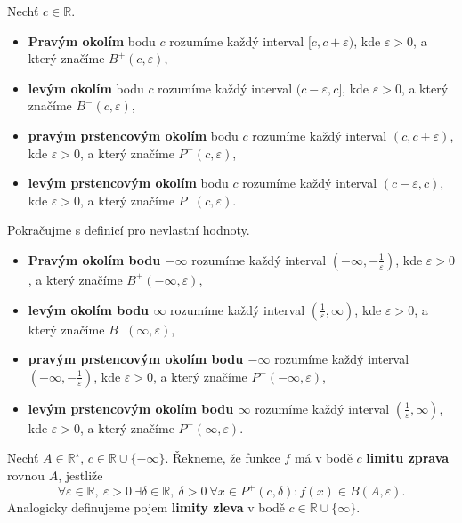 \begin{definice}
	Nechť $c\in \mathbb R $.
	\begin{itemize}
  \item \textbf{Pravým okolím} bodu $c$ rozumíme každý interval
  $[c, c + \varepsilon)$, kde $\varepsilon > 0$, a který značíme $B^+(c,\varepsilon)$,
  \item \textbf{levým okolím} bodu $c$ rozumíme každý interval
  $(c - \varepsilon, c]$, kde $\varepsilon > 0$, a který značíme $B^-(c,\varepsilon)$,
  \item \textbf{pravým prstencovým okolím} bodu $c$ rozumíme každý interval
  $(c, c + \varepsilon)$, kde $\varepsilon > 0$, a který značíme $P^+(c,\varepsilon)$,
  \item \textbf{levým prstencovým okolím} bodu $c$ rozumíme každý interval
  $(c - \varepsilon, c)$, kde $\varepsilon > 0$, a který značíme $P^-(c,\varepsilon)$.
\end{itemize}
Pokračujme s definicí pro nevlastní hodnoty.
\begin{itemize}
  \item \textbf{Pravým okolím bodu $-\infty$} rozumíme každý interval
  $\left(-\infty, -\frac{1}{\varepsilon}\right)$, kde $\varepsilon > 0$,
  a který značíme $B^+(-\infty,\varepsilon)$,
  \item \textbf{levým okolím bodu $\infty$} rozumíme každý interval
  $\left(\frac{1}{\varepsilon}, \infty\right)$, kde $\varepsilon > 0$,
  a který značíme $B^-(\infty,\varepsilon)$,
  \item \textbf{pravým prstencovým okolím bodu $-\infty$} rozumíme každý interval
  $\left(-\infty, -\frac{1}{\varepsilon}\right)$, kde $\varepsilon > 0$,
  a který značíme $P^+(-\infty,\varepsilon)$,
  \item \textbf{levým prstencovým okolím bodu $\infty$} rozumíme každý interval
  $\left(\frac{1}{\varepsilon}, \infty\right)$, kde $\varepsilon > 0$,
  a který značíme $P^-(\infty,\varepsilon)$.
\end{itemize}
\end{definice}

\begin{definice}
Nechť $A \in \mathbb{R}^\star$, $c \in \mathbb{R} \cup \{-\infty\}$.
Řekneme, že funkce $f$ má v bodě $c$ \textbf{limitu zprava} rovnou $A$, jestliže
\[
\forall \varepsilon \in \mathbb{R},\ \varepsilon > 0\ \exists \delta \in \mathbb{R},\
\delta > 0\ \forall x \in P^+(c,\delta) : f(x) \in B(A,\varepsilon).
\]
Analogicky definujeme pojem \textbf{limity zleva} v bodě
$c \in \mathbb{R} \cup \{\infty\}$.
\end{definice}

